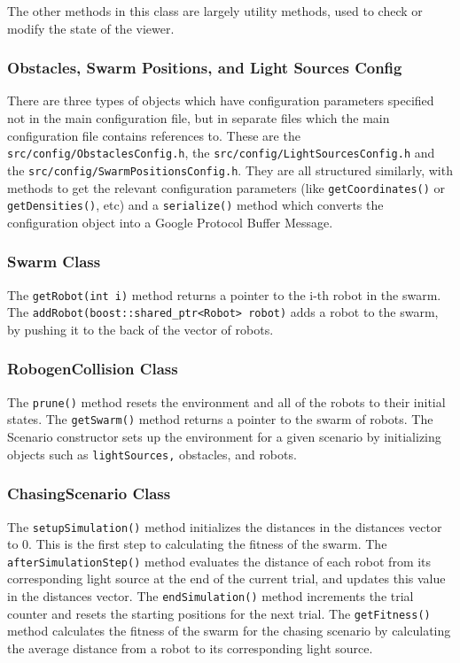 \documentclass[11pt,a4paper]{article}
\begin{document}
The other methods in this class are largely utility methods, used to check or
modify the state of the viewer.

\subsubsection{Obstacles, Swarm Positions, and Light Sources Config}
There are three types of objects which have configuration parameters specified
not in the main configuration file, but in separate files which the main
configuration file contains references to. These are the
\texttt{src/config/ObstaclesConfig.h}, the \texttt{src/config/LightSourcesConfig.h}
and the \texttt{src/config/SwarmPositionsConfig.h}. They are all structured
similarly, with methods to get the relevant configuration parameters (like
\texttt{getCoordinates()} or \texttt{getDensities()}, etc) and a
\texttt{serialize()} method which converts the configuration object into a
Google Protocol Buffer Message.


\subsubsection{Swarm Class}
The \texttt{getRobot(int i)} method returns a pointer to the i-th robot in the swarm.
The \texttt{addRobot(boost::shared\_ptr<Robot> robot)} adds a robot to the swarm, by
pushing it to the back of the vector of robots.

\subsubsection{RobogenCollision Class}

The \texttt{prune()} method resets the environment and all of the robots to their
initial states.  The \texttt{getSwarm()} method returns a pointer to the swarm of
robots.  The Scenario constructor sets up the environment for a given scenario
by initializing objects such as \texttt{lightSources,} obstacles, and robots.

\subsubsection{ChasingScenario Class}

The \texttt{setupSimulation()} method initializes the distances in the distances vector
to 0.  This is the first step to calculating the fitness of the swarm.  The
\texttt{afterSimulationStep()} method evaluates the distance of each robot from its
corresponding light source at the end of the current trial, and updates this
value in the distances vector.  The \texttt{endSimulation()} method increments the trial
counter and resets the starting positions for the next trial.  The \texttt{getFitness()}
method calculates the fitness of the swarm for the chasing scenario by
calculating the average distance from a robot to its corresponding light
source.
\end{document}

